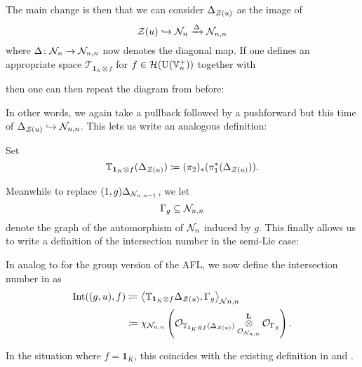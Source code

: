 The main change is then that we can consider $\Delta_{\mathcal Z(u)}$ as the image of
\[ \mathcal Z(u) \hookrightarrow \mathcal N_n \xrightarrow{\Delta} \mathcal N_{n,n} \]
where $\Delta \colon \mathcal N_n \to \mathcal N_{n,n}$ now denotes the diagonal map.
If one defines an appropriate space $\mathcal T_{\mathbf{1}_K \otimes f}$ for $f \in \mathcal H(\operatorname{U}(\mathbb V_n^+))$ together with
\begin{center}
\end{center}
then one can then repeat the diagram from before:
\begin{center}
\end{center}
In other words, we again take a pullback followed by a pushforward
but this time of $\Delta_{\mathcal Z(u)} \hookrightarrow \mathcal N_{n,n}$.
This lets us write an analogous definition:
\begin{definition}
  Set
  \[
    \mathbb T_{\mathbf{1}_K \otimes f} (\Delta_{\mathcal Z(u)})
    \coloneqq (\pi_2)_\ast(\pi_1^\ast(\Delta_{\mathcal Z(u)})).
  \]
\end{definition}
Meanwhile to replace $(1,g) \Delta_{\mathcal N_{n,n-1}}$, we let
\[ \Gamma_g \subseteq \mathcal N_{n,n} \]
denote the graph of the automorphism of $\mathcal N_n$ induced by $g$.
This finally allows us to write a definition of the intersection number in the semi-Lie case:
\begin{definition}
  [$\Int((g,u), f)$]
  \label{def:intersection_number_semi_lie_spherical}
  In analog to  for the group version of the AFL,
  we now define the intersection number in  as
  \begin{align*}
    \operatorname{Int}((g,u), f)
    &\coloneqq \left\langle
      \mathbb T_{\mathbf{1}_{K} \otimes f} \Delta_{\mathcal Z(u)},
      \Gamma_g \right\rangle _{\mathcal N{n,n}} \\
    &\coloneqq \chi_{\mathcal N_{n,n}} \left(
      \mathcal{O}_{\mathbb T_{\mathbf{1}_K \otimes f}(\Delta_{\mathcal Z(u)})}
      \mathop{\otimes}^{\mathbf{L}}_{\mathcal{O}_{\mathcal N_{n,n}}} \mathcal{O}_{\Gamma_g} \right).
    \end{align*}
\end{definition}
In the situation where $f = \mathbf{1}_K$,
this coincides with the existing definition in \cite[Equation (4.9)]{ref:survey}
and \cite[Remark 3.1]{ref:annalsAFL}.


